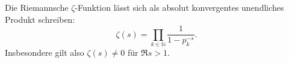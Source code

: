 \begin{frame}
    \begin{lemma}[Eulerprodukt]
        Die Riemannsche $\zeta$-Funktion lässt sich als absolut konvergentes unendliches Produkt schreiben:
    \[
        \zeta(s) = \prod_{k\in \mathbb{N}}\frac{1}{1-p_k^{-s}}.
    \]
    Insbesondere gilt also $\zeta(s) \neq 0$ für $\Re s > 1$.
    \end{lemma}
\end{frame}